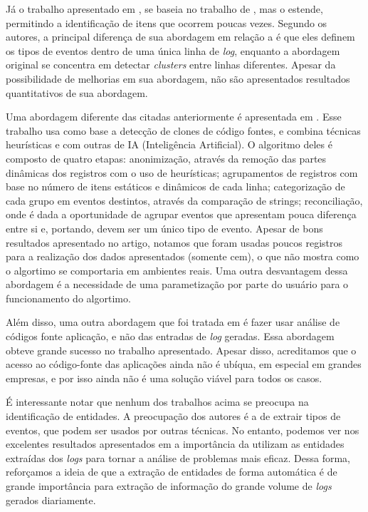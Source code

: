 \documentclass[
	12pt,				%
	openright,			%
	twoside,			%
	a4paper,			%
	english,			%
	spanish,			%
	brazil,				%
	]{abntex2}
\begin{document}
Já o trabalho apresentado em \cite{nagappan2010abstracting}, se baseia no trabalho de \cite{vaarandi2003data}, mas o estende, permitindo a identificação de itens que ocorrem poucas vezes. Segundo os autores, a principal diferença de sua abordagem em relação a \cite{vaarandi2003data} é que eles definem os tipos de eventos dentro de uma única linha de \emph{log}, enquanto a abordagem original se concentra em detectar \emph{clusters} entre linhas diferentes. Apesar da possibilidade de melhorias em sua abordagem, não são apresentados resultados quantitativos de sua abordagem.

Uma abordagem diferente das citadas anteriormente é apresentada em \cite{jiang2008automated}. Esse trabalho usa como base a detecção de clones de código fontes, e combina técnicas heurísticas e com outras de IA (Inteligência Artificial).  O algoritmo deles é composto de quatro etapas: anonimização, através da remoção das partes dinâmicas dos registros com o uso de heurísticas; agrupamentos de registros com base no número de itens estáticos e dinâmicos de cada linha; categorização de cada grupo em eventos destintos, através da comparação de strings; reconciliação, onde é dada a oportunidade de agrupar eventos que apresentam pouca diferença entre si e, portando, devem ser um único tipo de evento. Apesar de bons resultados apresentado no artigo, notamos que foram usadas poucos registros para a realização dos dados apresentados (somente cem), o que não mostra como o algortimo se comportaria em ambientes reais. Uma outra desvantagem dessa abordagem é a necessidade de uma parametização por parte do usuário para o funcionamento do algortimo.

Além disso, uma outra abordagem que foi tratada em \cite{xu2009detecting} é fazer usar análise de códigos fonte aplicação, e não das entradas de \emph{log} geradas. Essa abordagem obteve grande sucesso no trabalho apresentado. Apesar disso, acreditamos que o acesso ao código-fonte das aplicações ainda não é ubíqua, em especial em grandes empresas, e por isso ainda não é uma solução viável para todos os casos. 

É interessante notar que nenhum dos trabalhos acima se preocupa na identificação de entidades. A preocupação dos autores é a de extrair tipos de eventos, que podem ser usados por outras técnicas. No entanto, podemos ver nos excelentes resultados apresentados em \cite{xu2008mining,yen2013beehive} a importância da utilizam as entidades extraídas dos \emph{logs} para tornar a análise de problemas mais eficaz. Dessa forma, reforçamos a ideia de que a extração de entidades de forma automática é de grande importância para extração de informação do grande volume de \emph{logs} gerados diariamente.
\end{document}
